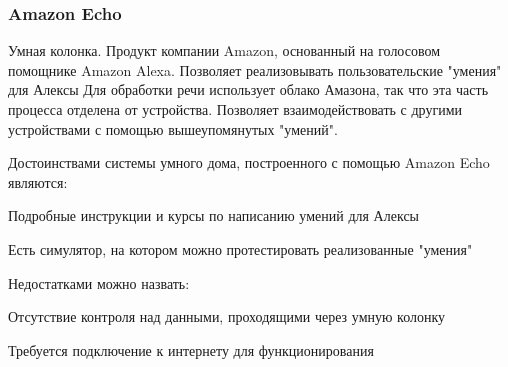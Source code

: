 \subsubsection{Amazon Echo}

Умная колонка. Продукт компании Amazon, основанный на голосовом помощнике Amazon Alexa.
Позволяет реализовывать пользовательские "умения" для Алексы \cite{AmazonEchoApps}
Для обработки речи использует облако Амазона, так что эта часть процесса отделена от устройства.
Позволяет взаимодействовать с другими устройствами с помощью вышеупомянутых "умений".

Достоинствами системы умного дома, построенного с помощью Amazon Echo являются:
\begin{list}{}{}
    \item Подробные инструкции и курсы по написанию умений для Алексы
    \item Есть симулятор, на котором можно протестировать реализованные "умения" \cite{AmazonEchoTests}
\end{list}
Недостатками можно назвать:
\begin{list}{}{}
    \item Отсутствие контроля над данными, проходящими через умную колонку
    \item Требуется подключение к интернету для функционирования
\end{list}

